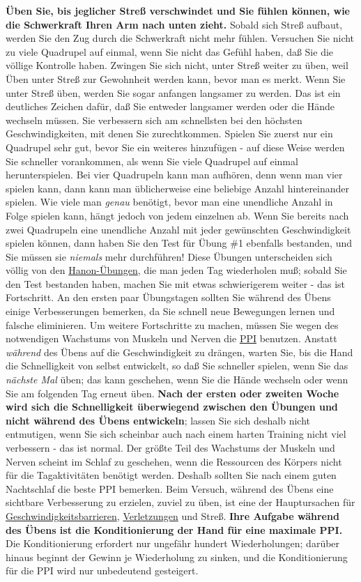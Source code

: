 \textbf{Üben Sie, bis jeglicher Streß verschwindet und Sie fühlen können, wie die Schwerkraft Ihren Arm nach unten zieht.}
Sobald sich Streß aufbaut, werden Sie den Zug durch die Schwerkraft nicht mehr fühlen.
Versuchen Sie nicht zu viele Quadrupel auf einmal, wenn Sie nicht das Gefühl haben, daß Sie die völlige Kontrolle haben.
Zwingen Sie sich nicht, unter Streß weiter zu üben, weil Üben unter Streß zur Gewohnheit werden kann, bevor man es merkt.
Wenn Sie unter Streß üben, werden Sie sogar anfangen langsamer zu werden.
Das ist ein deutliches Zeichen dafür, daß Sie entweder langsamer werden oder die Hände wechseln müssen.
Sie verbessern sich am schnellsten bei den höchsten Geschwindigkeiten, mit denen Sie zurechtkommen.
Spielen Sie zuerst nur ein Quadrupel sehr gut, bevor Sie ein weiteres hinzufügen - auf diese Weise werden Sie schneller vorankommen, als wenn Sie viele Quadrupel auf einmal herunterspielen.
Bei vier Quadrupeln kann man aufhören, denn wenn man vier spielen kann, dann kann man üblicherweise eine beliebige Anzahl hintereinander spielen.
Wie viele man \textit{genau} benötigt, bevor man eine unendliche Anzahl in Folge spielen kann, hängt jedoch von jedem einzelnen ab.
Wenn Sie bereits nach zwei Quadrupeln eine unendliche Anzahl mit jeder gewünschten Geschwindigkeit spielen können, dann haben Sie den Test für Übung \#1 ebenfalls bestanden, und Sie müssen sie \textit{niemals} mehr durchführen!
Diese Übungen unterscheiden sich völlig von den \hyperlink{c1iii7h}{Hanon-Übungen}, die man jeden Tag wiederholen muß; sobald Sie den Test bestanden haben, machen Sie mit etwas schwierigerem weiter - das ist Fortschritt.
An den ersten paar Übungstagen sollten Sie während des Übens einige Verbesserungen bemerken, da Sie schnell neue Bewegungen lernen und falsche eliminieren.
Um weitere Fortschritte zu machen, müssen Sie wegen des notwendigen Wachstums von Muskeln und Nerven die \hyperlink{c1ii15}{PPI} benutzen.
Anstatt \textit{während} des Übens auf die Geschwindigkeit zu drängen, warten Sie, bis die Hand die Schnelligkeit von selbst entwickelt, so daß Sie schneller spielen, wenn Sie das \textit{nächste Mal} üben; das kann geschehen, wenn Sie die Hände wechseln oder wenn Sie am folgenden Tag erneut üben.
\textbf{Nach der ersten oder zweiten Woche wird sich die Schnelligkeit überwiegend zwischen den Übungen und nicht während des Übens entwickeln}; lassen Sie sich deshalb nicht entmutigen, wenn Sie sich scheinbar auch nach einem harten Training nicht viel verbessern - das ist normal.
Der größte Teil des Wachstums der Muskeln und Nerven scheint im Schlaf zu geschehen, wenn die Ressourcen des Körpers nicht für die Tagaktivitäten benötigt werden.
Deshalb sollten Sie nach einem guten Nachtschlaf die beste PPI bemerken.
Beim Versuch, während des Übens eine sichtbare Verbesserung zu erzielen, zuviel zu üben, ist eine der Hauptursachen für \hyperlink{c1iv2b}{Geschwindigkeitsbarrieren}, \hyperlink{c1iii10hand}{Verletzungen} und Streß.
\textbf{Ihre Aufgabe während des Übens ist die Konditionierung der Hand für eine maximale PPI.}
Die Konditionierung erfordert nur ungefähr hundert Wiederholungen; darüber hinaus beginnt der Gewinn je Wiederholung zu sinken, und die Konditionierung für die PPI wird nur unbedeutend gesteigert.


